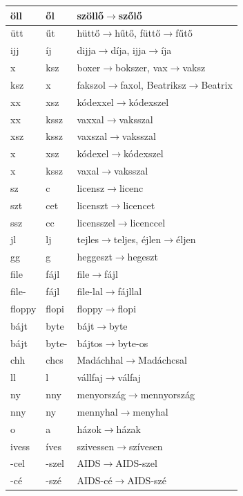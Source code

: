 \begin{longtable}[l]{llp{10cm}}
\\ \hline öll & ől & szöllő$\rightarrow$szőlő
\\ \hline ütt & űt & hüttő$\rightarrow$hűtő, füttő$\rightarrow$fűtő
\\ \hline ijj & íj & dijja$\rightarrow$díja, ijja$\rightarrow$íja
\\ \hline x & ksz & boxer$\rightarrow$bokszer, vax$\rightarrow$vaksz
\\ \hline ksz & x & fakszol$\rightarrow$faxol, Beatriksz$\rightarrow$Beatrix
\\ \hline xx & xsz & kódexxel$\rightarrow$kódexszel
\\ \hline xx & kssz & vaxxal$\rightarrow$vaksszal
\\ \hline xsz & kssz & vaxszal$\rightarrow$vaksszal
\\ \hline x & xsz & kódexel$\rightarrow$kódexszel
\\ \hline x & kssz & vaxal$\rightarrow$vaksszal
\\ \hline sz & c & licensz$\rightarrow$licenc
\\ \hline szt & cet & licenszt$\rightarrow$licencet
\\ \hline ssz & cc & licensszel$\rightarrow$licenccel
\\ \hline jl & lj & tejles$\rightarrow$teljes, éjlen$\rightarrow$éljen
\\ \hline gg & g & heggeszt$\rightarrow$hegeszt
\\ \hline file & fájl & file$\rightarrow$fájl
\\ \hline file- & fájl & file-lal$\rightarrow$fájllal
\\ \hline floppy & flopi & floppy$\rightarrow$flopi
\\ \hline bájt & byte & bájt$\rightarrow$byte
\\ \hline bájt & byte- & bájtos$\rightarrow$byte-os
\\ \hline chh & chcs & Madáchhal$\rightarrow$Madáchcsal
\\ \hline ll & l & vállfaj$\rightarrow$válfaj
\\ \hline ny & nny & menyország$\rightarrow$mennyország
\\ \hline nny & ny & mennyhal$\rightarrow$menyhal
\\ \hline o & a & házok$\rightarrow$házak
\\ \hline ivess & íves & szivessen$\rightarrow$szívesen
\\ \hline -cel & -szel & AIDS$\rightarrow$AIDS-szel
\\ \hline -cé & -szé & AIDS-cé$\rightarrow$AIDS-szé

\end{longtable}
